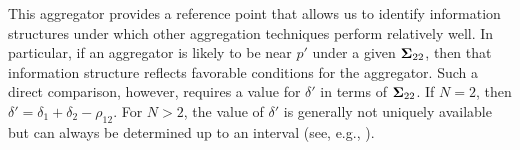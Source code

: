\documentclass[12pt]{article}
\renewcommand{\P}{\mathbb{P}}
\theoremstyle{definition}
\theoremstyle{definition}
\def\P{{\mathbb P}}
\begin{document}
This aggregator provides a reference point that allows us to identify information structures under which other aggregation techniques perform relatively well. In particular, if an aggregator is likely to be near $p'$ under a given ${\bf\Sigma}_{22}$, then that information structure reflects favorable conditions for the aggregator. Such a direct comparison, however, requires a value for $\delta'$ in terms of ${\bf\Sigma}_{22}$. If $N = 2$, then $\delta' = \delta_1 + \delta_2 - \rho_{12}$. For $N > 2$, the value of $\delta'$ is generally not uniquely available but can always be determined up to an interval (see, e.g., \citealt[chap. 5.4]{deza1997geometry}). 
%
\end{document}
